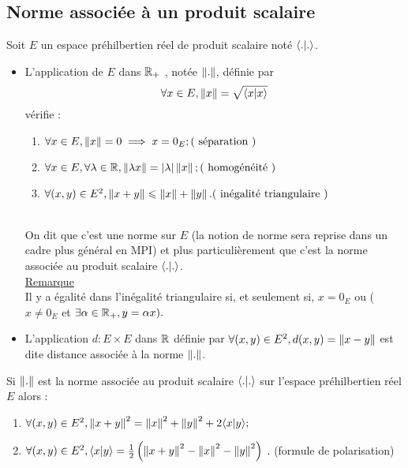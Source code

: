 \subsection{Norme associée à un produit scalaire}
Soit \(E\) un espace préhilbertien réel de produit scalaire noté \(\langle . | . \rangle\).
\begin{defprop}
    \begin{itemize}
    \item L’application de \(E\) dans \(\mathbb{R}_+\) , notée \(\left\|.\right\|\), définie par
        \[\forall x \in E, \left\|x\right\| = \sqrt{\langle x | x \rangle}\]
    vérifie :
    \begin{enumerate}
        \item\( \forall x \in E, \norme{x} = 0 \imp x = 0_E ; \hfill( \text{ séparation })\)
        \item\( \forall x \in E, \forall \lambda  \in \R, \norme{\lambda x} = \abs{\lambda } \norme{x} ;\hfill (\text{ homogénéité })\)
        \item\( \forall (x, y) \in E^2, \norme{x +y} \leq \norme{x} + \norme{y} . \hfill(\text{ inégalité triangulaire })\)
    \end{enumerate}~\\
    On dit que c’est une norme sur \(E\) (la notion de norme sera reprise dans un cadre plus général en MPI) et plus particulièrement que c’est la norme associée au produit scalaire \(\langle . | . \rangle\).\\
    \underline{Remarque}\\
    Il y a égalité dans l’inégalité triangulaire si, et seulement si, \(x = 0_E\) ou (\(x\neq 0_E\) et \(\exists \alpha \in \mathbb{R}_+, y = \alpha x).\)
    \item L’application \(d : E \times E\) dans \(\mathbb{R}\) définie par \(\forall (x, y) \in E^2, d(x, y) = \left\|x-y\right\|\) est dite distance associée à la norme \( \left\|.\right\|\).
\end{itemize}
\end{defprop}
\begin{defprop}
    Si \(\left\|.\right\|\) est la norme associée au produit scalaire \(\langle . | . \rangle\) sur l’espace préhilbertien réel \(E\) alors :
    \begin{enumerate}
        \item \( \forall (x, y) \in E^2, \left\|x +y \right\|^2 = \left\|x\right\|^2 + \left\|y\right\|^2 + 2 \langle x | y \rangle ;\)
        \item \( \forall (x, y) \in E^2, \langle x | y \rangle = \frac{1}{2}\left(\left\|x +y\right\|^2 - \left\|x\right\|^2 - \left\|y\right\|^2\right)\) . \hfill (formule de polarisation)
    \end{enumerate}
\end{defprop}

